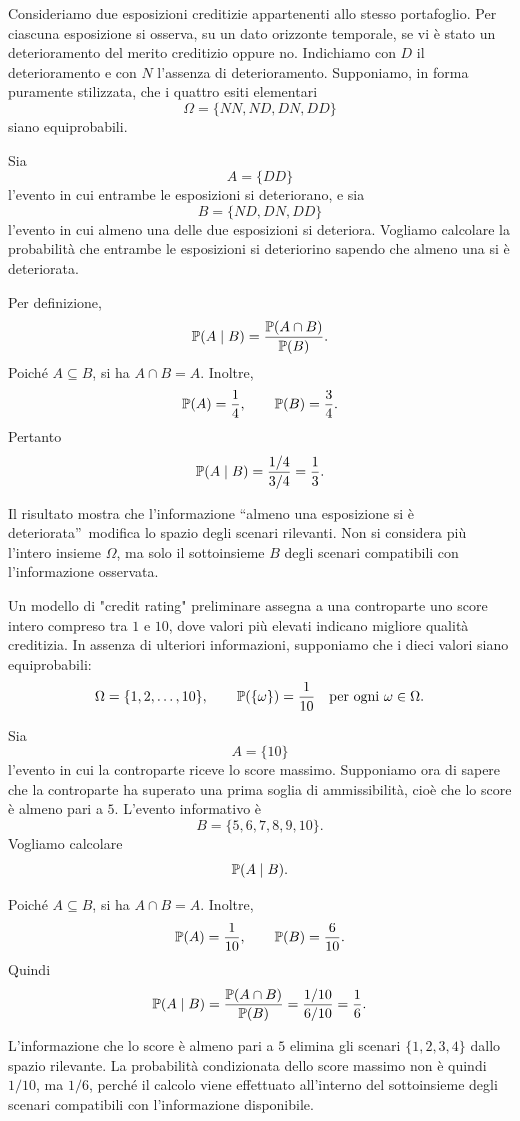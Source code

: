 \begin{example}
Consideriamo due esposizioni creditizie appartenenti allo stesso portafoglio.
Per ciascuna esposizione si osserva, su un dato orizzonte temporale, se vi
\`{e} stato un deterioramento del merito creditizio oppure no. Indichiamo con
$D$ il deterioramento e con $N$ l'assenza di deterioramento. Supponiamo, in
forma puramente stilizzata, che i quattro esiti elementari
\[
\Omega=\{NN,ND,DN,DD\}
\]
siano equiprobabili.

Sia
\[
A=\{DD\}
\]
l'evento in cui entrambe le esposizioni si deteriorano, e sia
\[
B=\{ND,DN,DD\}
\]
l'evento in cui almeno una delle due esposizioni si deteriora. Vogliamo
calcolare la probabilit\`{a} che entrambe le esposizioni si deteriorino
sapendo che almeno una si \`{e} deteriorata.

Per definizione,
\[
\mathbb{P}(A\mid B)=\frac{\mathbb{P}(A\cap B)}{\mathbb{P}(B)}.
\]
Poich\'{e} $A\subseteq B$, si ha $A\cap B=A$. Inoltre,
\[
\mathbb{P}(A)=\frac{1}{4},\qquad\mathbb{P}(B)=\frac{3}{4}.
\]
Pertanto
\[
\mathbb{P}(A\mid B)=\frac{1/4}{3/4}=\frac{1}{3}.
\]


Il risultato mostra che l'informazione \textquotedblleft almeno una
esposizione si \`{e} deteriorata\textquotedblright\ modifica lo spazio degli
scenari rilevanti. Non si considera pi\`{u} l'intero insieme $\Omega$, ma solo
il sottoinsieme $B$ degli scenari compatibili con l'informazione osservata.
\end{example}

\begin{example}
Un modello di "credit rating" preliminare assegna a una controparte uno score intero compreso tra
$1$ e $10$, dove valori pi\`{u} elevati indicano migliore qualit\`{a}
creditizia. In assenza di ulteriori informazioni, supponiamo che i dieci
valori siano equiprobabili:
\[
\Omega=\{1,2,\ldots,10\},\qquad\Prob(\{\omega\})=\frac{1}{10}%
\quad\text{per ogni }\omega\in\Omega.
\]


Sia
\[
A=\{10\}
\]
l'evento in cui la controparte riceve lo score massimo. Supponiamo ora di
sapere che la controparte ha superato una prima soglia di ammissibilit\`{a},
cio\`{e} che lo score \`{e} almeno pari a $5$. L'evento informativo \`{e}
\[
B=\{5,6,7,8,9,10\}.
\]
Vogliamo calcolare
\[
\mathbb{P}(A\mid B).
\]


Poich\'{e} $A\subseteq B$, si ha $A\cap B=A$. Inoltre,
\[
\mathbb{P}(A)=\frac{1}{10},\qquad\mathbb{P}(B)=\frac{6}{10}.
\]
Quindi
\[
\mathbb{P}(A\mid B)=\frac{\mathbb{P}(A\cap B)}{\mathbb{P}(B)}=\frac
{1/10}{6/10}=\frac{1}{6}.
\]


L'informazione che lo score \`{e} almeno pari a $5$ elimina gli scenari
$\{1,2,3,4\}$ dallo spazio rilevante. La probabilit\`{a} condizionata dello
score massimo non \`{e} quindi $1/10$, ma $1/6$, perch\'{e} il calcolo viene
effettuato all'interno del sottoinsieme degli scenari compatibili con
l'informazione disponibile.
\end{example}

